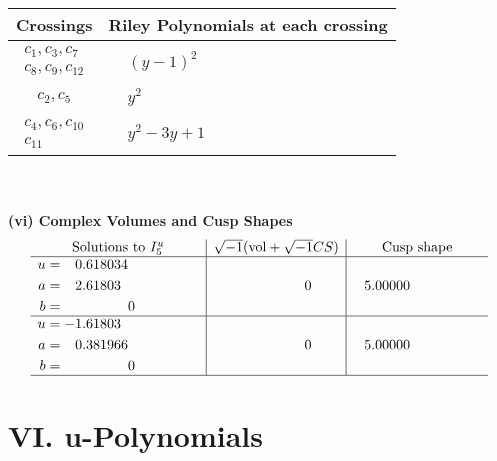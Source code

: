 \documentclass[1p]{elsarticle_modified}
\theoremstyle{definition}
\newcommand{\I}{\sqrt{-1}}
\begin{document}
\begin{tabular}{m{50pt}|m{274pt}}
Crossings & \hspace{64pt}Riley Polynomials at each crossing \\
\hline $$\begin{aligned}c_{1},c_{3},c_{7}\\c_{8},c_{9},c_{12}\end{aligned}$$&$\begin{aligned}
&(y-1)^2
\end{aligned}$\\
\hline $$\begin{aligned}c_{2},c_{5}\end{aligned}$$&$\begin{aligned}
&y^2
\end{aligned}$\\
\hline $$\begin{aligned}c_{4},c_{6},c_{10}\\c_{11}\end{aligned}$$&$\begin{aligned}
&y^2-3 y+1
\end{aligned}$\\
\hline
\end{tabular}\\~\\
\newpage\flushleft \textbf{(vi) Complex Volumes and Cusp Shapes}
$$\begin{array}{c|c|c}  
\text{Solutions to }I^u_{5}& \I (\text{vol} + \sqrt{-1}CS) & \text{Cusp shape}\\
 \hline 
\begin{aligned}
u &= \phantom{-}0.618034\phantom{ +0.000000I} \\
a &= \phantom{-}2.61803\phantom{ +0.000000I} \\
b &= \phantom{-0.000000 } 0\end{aligned}
 & \phantom{-0.000000 } 0 & \phantom{-}5.00000\phantom{ +0.000000I} \\ \hline\begin{aligned}
u &= -1.61803\phantom{ +0.000000I} \\
a &= \phantom{-}0.381966\phantom{ +0.000000I} \\
b &= \phantom{-0.000000 } 0\end{aligned}
 & \phantom{-0.000000 } 0 & \phantom{-}5.00000\phantom{ +0.000000I}\\
 \hline 
 \end{array}$$\newpage
\newpage\renewcommand{\arraystretch}{1}
\centering \section*{ VI. u-Polynomials}
\end{document}
